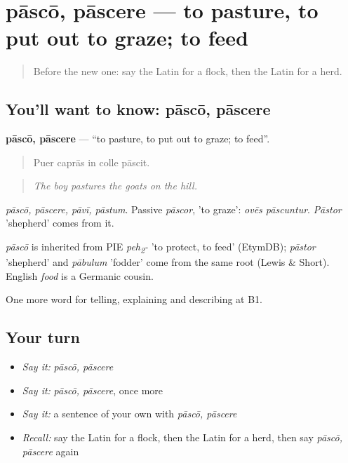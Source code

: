 \section[pāscō, pāscere]{pāscō, pāscere — to pasture, to put out to graze; to feed}

\label{lesson:LA-C477-pasco}



\begin{quote}
Before the new one: say the Latin for a flock, then the Latin for a herd.
\end{quote}

\subsection*{You'll want to know: pāscō, pāscere}
\textbf{pāscō, pāscere} — \textquotedblleft{}to pasture, to put out to graze; to feed\textquotedblright{}.

\begin{quote}
Puer caprās in colle pāscit.
\end{quote}

\begin{quote}
\emph{The boy pastures the goats on the hill.}
\end{quote}

\emph{pāscō, pāscere, pāvī, pāstum}. Passive \emph{pāscor}, 'to graze': \emph{ovēs pāscuntur}. \emph{Pāstor} 'shepherd' comes from it.

\begin{cousinweb}
\emph{pāscō} is inherited from PIE \emph{peh\textsubscript{2}-} 'to protect, to feed' (EtymDB); \emph{pāstor} 'shepherd' and \emph{pābulum} 'fodder' come from the same root (Lewis \& Short). English \emph{food} is a Germanic cousin.
\end{cousinweb}

\begin{grammarlens}[title={What you've built}]
One more word for telling, explaining and describing at B1.
\end{grammarlens}

\subsection*{Your turn}
\begin{itemize}
\raggedright
  \item \emph{Say it:} \emph{pāscō, pāscere}
  \item \emph{Say it:} \emph{pāscō, pāscere}, once more
  \item \emph{Say it:} a sentence of your own with \emph{pāscō, pāscere}
  \item \emph{Recall:} say the Latin for a flock, then the Latin for a herd, then say \emph{pāscō, pāscere} again
\end{itemize}

